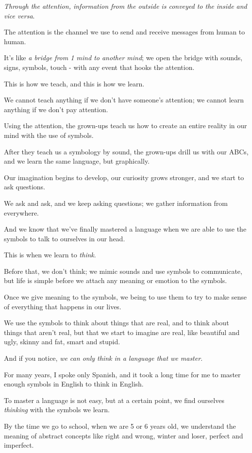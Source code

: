 \documentclass{article}
\numberwithin{equation}{section}
\begin{document}
\textit{Through the attention, information from the outside is conveyed to the inside and vice versa}.

The attention is the channel we use to send and receive messages from human to human.

It's like \textit{a bridge from 1 mind to another mind}; we open the bridge with sounds, signs, symbols, touch - with any event that hooks the attention.

This is how we teach, and this is how we learn.

We cannot teach anything if we don't have someone's attention; we cannot learn anything if we don't pay attention.

%
Using the attention, the grown-ups teach us how to create an entire reality in our mind with the use of symbols.

After they teach us a symbology by sound, the grown-ups drill us with our ABCs, and we learn the same language, but graphically.

Our imagination begins to develop, our curiosity grows stronger, and we start to ask questions.

We ask and ask, and we keep asking questions; we gather information from everywhere.

And we know that we've finally mastered a language when we are able to use the symbols to talk to ourselves in our head.

This is when we learn to \textit{think}.

Before that, we don't think; we mimic sounds and use symbols to communicate, but life is simple before we attach any meaning or emotion to the symbols.

%
Once we give meaning to the symbols, we being to use them to try to make sense of everything that happens in our lives.

We use the symbols to think about things that are real, and to think about things that aren't real, but that we start to imagine are real, like beautiful and ugly, skinny and fat, smart and stupid.

And if you notice, \textit{we can only think in a language that we master}.

For many years, I spoke only Spanish, and it took a long time for me to master enough symbols in English to think in English.

To master a language is not easy, but at a certain point, we find ourselves \textit{thinking} with the symbols we learn.

%
By the time we go to school, when we are 5 or 6 years old, we understand the meaning of abstract concepts like right and wrong, winter and loser, perfect and imperfect.
\end{document}
